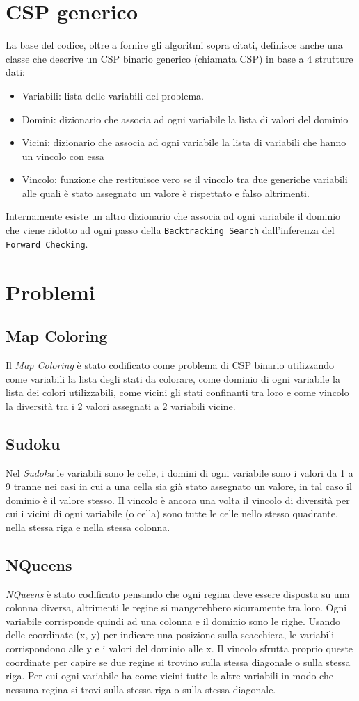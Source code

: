\documentclass[11pt]{article}
\begin{document}
\section{CSP generico}
La base del codice, oltre a fornire gli algoritmi sopra citati, definisce anche una classe che descrive un CSP binario generico (chiamata CSP) in base a 4 strutture dati:
\begin{itemize}
  \item Variabili: lista delle variabili del problema.
  \item Domini: dizionario che associa ad ogni variabile la lista di valori del dominio
  \item Vicini: dizionario che associa ad ogni variabile la lista di variabili che hanno un vincolo con essa
  \item Vincolo: funzione che restituisce vero se il vincolo tra due generiche variabili alle quali è stato assegnato un valore è rispettato e falso altrimenti.
\end{itemize}
Internamente esiste un altro dizionario che associa ad ogni variabile il dominio che viene ridotto ad ogni passo della \texttt{Backtracking Search} dall’inferenza del \texttt{Forward Checking}.

\section{Problemi}
\subsection{Map Coloring}
Il \textit{Map Coloring} è stato codificato come problema di CSP binario utilizzando come variabili la lista degli stati da colorare, come dominio di ogni variabile la lista dei colori utilizzabili, come vicini gli stati confinanti tra loro e come vincolo la diversità tra i 2 valori assegnati a 2 variabili vicine.
\subsection{Sudoku}
Nel \textit{Sudoku} le variabili sono le celle, i domini di ogni variabile sono i valori da 1 a 9 tranne nei casi in cui a una cella sia già stato assegnato un valore, in tal caso il dominio è il valore stesso. Il vincolo è ancora una volta il vincolo di diversità per cui i vicini di ogni variabile (o cella) sono tutte le celle nello stesso quadrante, nella stessa riga e nella stessa colonna. 
\subsection{NQueens}
\textit{NQueens} è stato codificato pensando che ogni regina deve essere disposta su una colonna diversa, altrimenti le regine si mangerebbero sicuramente tra loro. Ogni variabile corrisponde quindi ad una colonna e il dominio sono le righe. Usando delle coordinate (x, y) per indicare una posizione sulla scacchiera, le variabili corrispondono alle y e i valori del dominio alle x. Il vincolo sfrutta proprio queste coordinate per capire se due regine si trovino sulla stessa diagonale o sulla stessa riga. Per cui ogni variabile ha come vicini tutte le altre variabili in modo che nessuna regina si trovi sulla stessa riga o sulla stessa diagonale.
\end{document}
